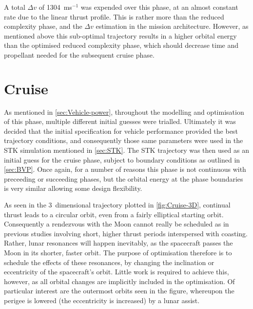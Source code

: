 A total $\Delta v$ of 1304~ms$^{-1}$ was expended over this phase, at an almost constant rate due to the linear thrust profile. This is rather more than the reduced complexity phase, and the $\Delta v$ estimation in the mission architecture. However, as mentioned above this sub-optimal trajectory results in a higher orbital energy than the optimised reduced complexity phase, which should decrease time and propellant needed for the subsequent cruise phase.



\clearpage


\section{Cruise} \label{sec:Cruise}
As mentioned in \autoref{sec:Vehicle-power}, throughout the modelling and optimisation of this phase, multiple different initial guesses were trialled. Ultimately it was decided that the initial specification for vehicle performance provided the best trajectory conditions, and consequently those same parameters were used in the STK simulation mentioned in \autoref{sec:STK}. The STK trajectory was then used as an initial guess for the cruise phase, subject to boundary conditions as outlined in \autoref{sec:BVP}. Once again, for a number of reasons this phase is not continuous with preceeding or succeeding phases, but the orbital energy at the phase boundaries is very similar allowing some design flexibility.

As seen in the 3~dimensional trajectory plotted in \autoref{fig:Cruise-3D}, continual thrust leads to a circular orbit, even from a fairly elliptical starting orbit. Consequently a rendezvous with the Moon cannot really be scheduled as in previous studies involving short, higher thrust periods interspersed with coasting. Rather, lunar resonances will happen inevitably, as the spacecraft passes the Moon in its shorter, faster orbit. The purpose of optimisation therefore is to schedule the effects of these resonances, by changing the inclination or eccentricity of the spacecraft's orbit. Little work is required to achieve this, however, as all orbital changes are implicitly included in the optimisation. Of particular interest are the outermost orbits seen in the figure, whereupon the perigee is lowered (the eccentricity is increased) by a lunar assist.

